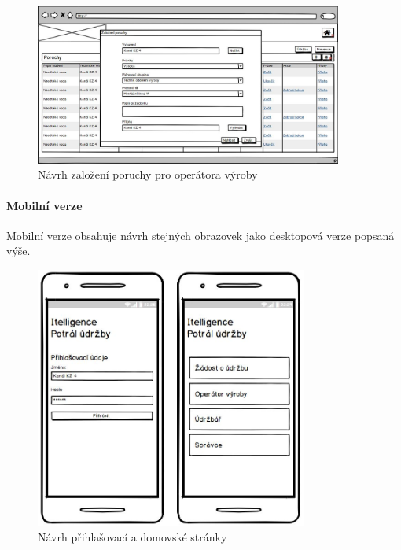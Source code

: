 \documentclass[thesis=M,czech]{FITthesis}[2012/06/26]
\begin{document}
\begin{figure}[H]
	\centering
	\includegraphics[width=0.9\textwidth]{images/bal_poruchy_seznam_zalozeni_poruchy}
	\caption{Návrh založení poruchy pro operátora výroby}
	\label{img:bal_poruchy_seznam_zalozeni_poruchy_desktop}
\end{figure}

\paragraph{Mobilní verze}
Mobilní verze obsahuje návrh stejných obrazovek jako desktopová verze popsaná výše. 

\begin{figure}[H]
	\centering
	\includegraphics[width=0.8\textwidth]{images/bal_login_hompage_mob}
	\caption{Návrh přihlašovací a domovské stránky}
	\label{img:bal_login_hompage_mob}
\end{figure}
\end{document}
